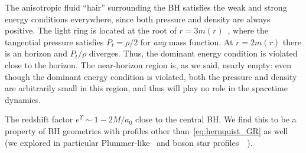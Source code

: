 \documentclass[twocolumn,preprintnumbers,nofootinbib,prd,superscriptaddress,aps]{revtex4-1}
\newcommand{\beq}{\begin{eqnarray}}
\newcommand{\eeq}{\end{eqnarray}}
\begin{document}
The anisotropic fluid ``hair'' surrounding the BH satisfies the weak and strong energy conditions everywhere, since both pressure and density are always positive.
The light ring is located at the root of $r=3m(r)$~\cite{chandrasekhar1992mathematical,Cardoso:2008bp}, where the tangential pressure satisfies $P_t=\rho/2$ for {\it any} mass function. At 
$r=2m(r)$ there is an horizon and $P_t/\rho$ diverges. Thus, the dominant energy condition is violated close to the horizon.
The near-horizon region is, as we said, nearly empty: even though the dominant energy condition is violated, both the pressure and density are arbitrarily small in this region,
and thus will play no role in the spacetime dynamics. 


The redshift factor $e^\Upsilon\sim 1-2M/a_0$ close to the central BH. We find this to be a property of BH geometries with
profiles other than~\eqref{eq:hernquist_GR} as well (we explored in particular Plummer-like~\cite{1911MNRAS..71..460P} and boson star profiles~~\cite{Liebling:2012fv,Annulli:2020lyc}). 
\end{document}
